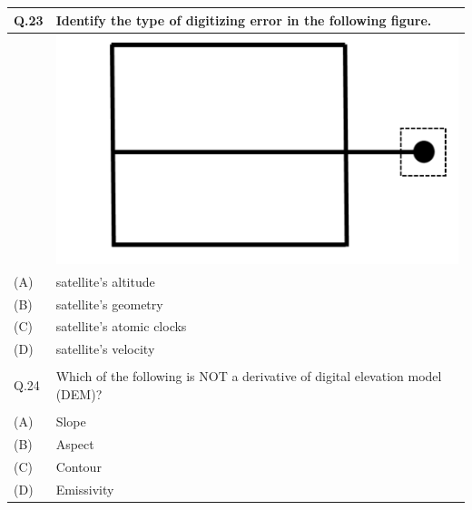 \documentclass[12pt]{article}
\begin{document}
\begin{table}[H]
\renewcommand{\arraystretch}{3}
\setlength{\tabcolsep}{8pt}
\begin{tabular}{|l|p{15cm}|}
\hline

Q.23 &Identify the type of digitizing error in the following figure.\\ \hline 

 &\vspace{0.3cm} \hspace{3cm} \includegraphics[scale = 0.8]{LatexImage3.png} \\ \hline
(A)&satellite’s altitude\\ \hline
(B)&satellite’s geometry \\ \hline
(C)&satellite’s atomic clocks\\ \hline
(D)&satellite’s velocity \\ \hline
 & \\ \hline

Q.24 & Which of the following is NOT a derivative of digital elevation model (DEM)?\\ \hline
 & \\ \hline
(A)&Slope\\ \hline
(B)&Aspect\\ \hline
(C)&Contour\\ \hline
(D)&Emissivity\\ \hline

 

\end{tabular}
\end{table}
\end{document}
